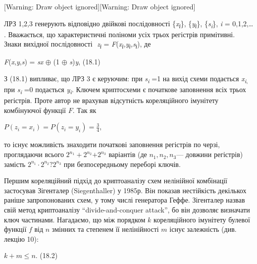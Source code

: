\bigskip

[Warning: Draw object ignored][Warning: Draw object ignored]

ЛРЗ 1,2,3 генерують відповідно двійкові послідовності
\{\textit{x}\textit{\textsubscript{і}}\},
\{\textit{y}\textit{\textsubscript{і}}\},
\{\textit{s}\textit{\textsubscript{i}}\},  \textit{i} = 0,1,2,… . Вважається,
що характеристичні поліноми усіх трьох регістрів примітивні. Знаки вихідної
послідовності   $ $ \textit{z}\textit{\textsubscript{і}} =
\textit{F}(\textit{x}\textit{\textsubscript{і}}\textit{,}\textit{y}\textit{\textsubscript{і}}\textit{,}\textit{s}\textit{\textsubscript{і}}),
де


\bigskip

{\centering
\textit{ }\textit{F}(\textit{x},\textit{y},\textit{s}) = \textit{sx} ${\oplus}$
(1 ${\oplus}$  \textit{s})\textit{y},  (18.1)
\par}


\bigskip

З (18.1) випливає, що ЛРЗ 3 є керуючим:  при
\textit{s}\textit{\textsubscript{i}} =1  на вихід схеми подається 
\textit{x}\textit{\textsubscript{i}}\textsubscript{,  }при 
\textit{s}\textit{\textsubscript{i}}\textsubscript{ }=0  подається\textit{
}\textit{y}\textit{\textsubscript{i}}. Ключем криптосхеми є початкове
заповнення всіх трьох регістрів. Проте автор не врахував відсутність
кореляційного імунітету комбінуючої функції  ${F}$. Так як 

{\centering
 ${P(z_{{i}}=x_{{i}})=P(z_{{i}}=y_{{i}})=\frac{3}{4}}$,
\par}

то існує можливість знаходити початкові заповнення регістрів по черзі,
проглядаючи всього  ${2^{{n_{{1}}}}+2^{n_{{2}}}{+2^{n_{{3}}}}}$ варіантів (де 
${n_{{1}},n_{{2}},n_{{3}}}$--- довжини регістрів) замість  ${2^{{n_{{1}}}}\cdot
2^{n_{{2}}}{?2^{n_{{3}}}}}$ при безпосередньому переборі ключів.

Першим кореляційний підхід до криптоаналізу схем нелінійної комбінації
застосував Зігенталер (Siegenthaller) у 1985р. Він показав нестійкість
декількох раніше запропонованих схем, у тому числі генератора Геффе. Зігенталер
назвав свій метод криптоаналізу “divide{}-and{}-conquer attack”, бо він
дозволяє визначати ключ частинами. Нагадаємо, що між порядком  ${k}$
кореляційного імунітету булевої функції  ${f}$ від  ${n}$ змінних та степенем
її нелінійності  ${m}$ існує залежність (див. лекцію 10): 


\bigskip

{\centering
  ${k+m\le n}$.  (18.2)
\par}


